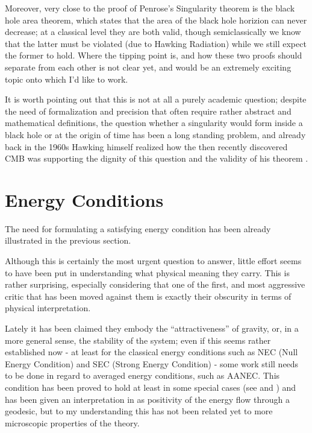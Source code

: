 \documentclass[12pt, a4paper]{article}
\begin{document}
Moreover, very close to the proof of Penrose's Singularity theorem is the black hole area theorem, which states that the area of the black hole horizion can never decrease; at a classical level they are both valid, though semiclassically we know that the latter must be violated (due to Hawking Radiation) while we still expect the former to hold. Where the tipping point is, and how these two proofs should separate from each other is not clear yet, and would be an extremely exciting topic onto which I'd like to work.

It is worth pointing out that this is not at all a purely academic question; despite the need of formalization and precision that often require rather abstract and mathematical definitions, the question whether a singularity would form inside a black hole or at the origin of time has been a long standing problem, and already back in the 1960s Hawking himself realized how the then  recently discovered CMB was supporting the dignity of this question and the validity of his theorem \cite{hawking1968cosmic}.

\clearpage

\section{Energy Conditions}

The need for formulating a satisfying energy condition has been already illustrated in the previous section.

Although this is certainly the most urgent question to answer, little effort seems to have been put in understanding what physical meaning they carry. This is rather surprising, especially considering that one of the first, and most aggressive critic that has been moved against them is exactly their obscurity in terms of physical interpretation.

Lately it has been claimed they embody the ``attractiveness''  of gravity, or, in a more general sense, the stability of the system; even if this seems rather established now - at least for the classical energy conditions such as NEC (Null Energy Condition) and SEC (Strong Energy Condition) - some work still needs to be done in regard to averaged energy conditions, such as AANEC. 
This condition has been proved to hold at least in some special cases (see \cite{wall2010proving} and \cite{verch2000averaged}) and has been given an interpretation in \cite{curiel2017primer} as positivity of the energy flow through a geodesic, but to my understanding this has not been related yet to more microscopic properties of the theory.
\end{document}
